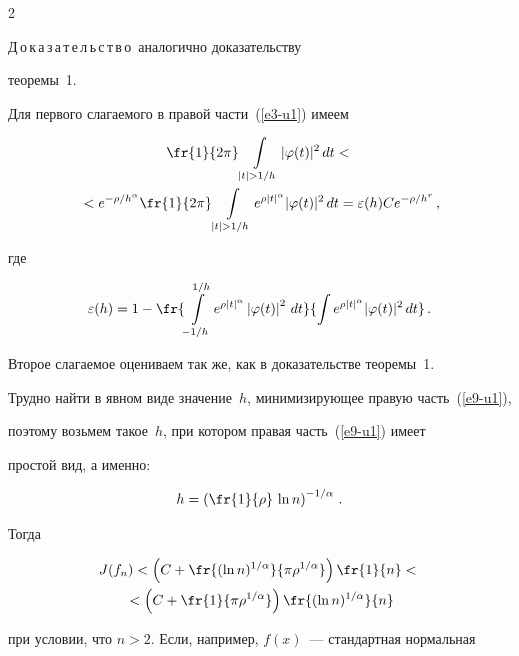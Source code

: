 \begin{multicols}{2}
\noindent

Д\,о\,к\,а\,з\,а\,т\,е\,л\,ь\,с\,т\,в\,о\ аналогично доказательству\linebreak

теоремы~1.

Для первого слагаемого в правой час\-ти~(\ref{e3-u1}) имеем

\begin{multline*}

\fr{1}{2\pi}\int\limits_{|t|>1/h}|\varphi(t)|^2\,dt<{}\\

{}<

e^{-\rho/h^\alpha}\fr{1}{2\pi}

\int\limits_{|t|>1/h}e^{\rho|t|^\alpha}|\varphi(t)|^2\,dt

=\varepsilon(h)Ce^{-\rho/h^r}\,,

\end{multline*}

где

$$

\varepsilon(h)= 1-\fr{\int\limits_{-1/h}^{1/h}e^{\rho|t|^\alpha}\left\vert\varphi(t)\right\vert^2\,dt}

{\int e^{\rho|t|^\alpha}|\varphi(t)|^2\,dt}\,.

$$

Второе слагаемое оцениваем так же, как в доказательстве теоремы~1.



Трудно найти в явном виде значение~$h$, минимизирующее правую часть~(\ref{e9-u1}), 

поэтому возьмем такое~$h$, при котором правая часть~(\ref{e9-u1}) имеет

простой вид, а именно:

$$

h=\left(\fr{1}{\rho}\,\ln n\right)^{-1/\alpha}\,.

$$

Тогда

\begin{multline*}

J(f_n)< \left(C+\fr{(\ln n)^{1/\alpha}}{\pi\rho^{1/\alpha}}\right)\fr{1}{n}<{}\\

{}<

\left(C+\fr{1}{\pi\rho^{1/\alpha}}\right)\fr{(\ln n)^{1/\alpha}}{n}

\end{multline*}

при условии, что $n>2$. Если, например, $f(x)$~--- стандартная нормальная


\end{multicols}
